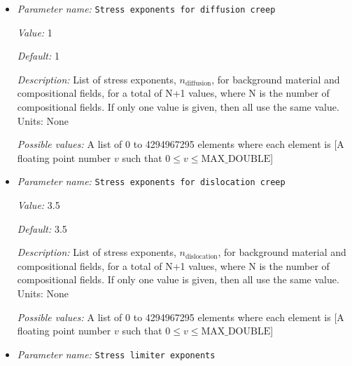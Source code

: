 \begin{itemize}
{\it Value:} 0.


{\it Default:} 0.


{\it Description:} List of strain weakening interval initial strains for the diffusion and dislocation prefactor parameters of the background material and compositional fields, for a total of N+1 values, where N is the number of compositional fields. If only one value is given, then all use the same value.  Units: None


{\it Possible values:} A list of 0 to 4294967295 elements where each element is [A floating point number $v$ such that $0 \leq v \leq \text{MAX\_DOUBLE}$]
\item {\it Parameter name:} {\tt Stress exponents for diffusion creep}
\label{parameters:Material model/Visco Plastic/Stress exponents for diffusion creep}


{\it Value:} 1


{\it Default:} 1


{\it Description:} List of stress exponents, $n_{\text{diffusion}}$, for background material and compositional fields, for a total of N+1 values, where N is the number of compositional fields. If only one value is given, then all use the same value.  Units: None


{\it Possible values:} A list of 0 to 4294967295 elements where each element is [A floating point number $v$ such that $0 \leq v \leq \text{MAX\_DOUBLE}$]
\item {\it Parameter name:} {\tt Stress exponents for dislocation creep}
\label{parameters:Material model/Visco Plastic/Stress exponents for dislocation creep}


{\it Value:} 3.5


{\it Default:} 3.5


{\it Description:} List of stress exponents, $n_{\text{dislocation}}$, for background material and compositional fields, for a total of N+1 values, where N is the number of compositional fields. If only one value is given, then all use the same value.  Units: None


{\it Possible values:} A list of 0 to 4294967295 elements where each element is [A floating point number $v$ such that $0 \leq v \leq \text{MAX\_DOUBLE}$]
\item {\it Parameter name:} {\tt Stress limiter exponents}
\label{parameters:Material model/Visco Plastic/Stress limiter exponents}



\end{itemize}

